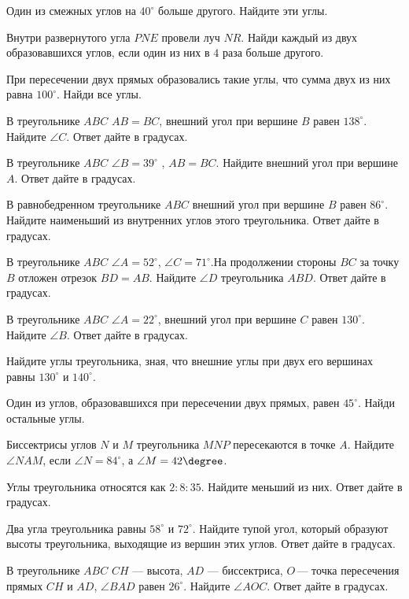 \begin{class}[number=3]
	\begin{listofex}
		\item Один из смежных углов на \( 40^{\circ} \) больше другого. Найдите эти углы.
		\item Внутри развернутого угла \( PNE \) провели луч  \( NR \). Найди каждый из двух  образовавшихся углов, если один из них в \( 4 \) раза больше другого.  
		\item При пересечении двух прямых образовались такие углы, что сумма двух из них равна \( 100^{\circ} \). Найди все углы.
		\item В треугольнике \( ABC \)    \( AB=BC \),   внешний угол при вершине \( B  \)  равен \( 138^{\circ} \).   Найдите \( \angle C \).   Ответ дайте в градусах.
		\item В треугольнике \( ABC \)   \( \angle B= 39^{\circ} \) ,  \(  AB  =BC \).   Найдите внешний угол при вершине \( A \).   Ответ дайте в градусах.
		\item В равнобедренном треугольнике \( ABC \)  внешний угол при вершине \( B \) равен \( 86^{\circ} \). Найдите наименьший из внутренних углов этого треугольника. Ответ дайте в градусах.
		\item В треугольнике \( ABC \)  \( \angle A = 52^{\circ} \), \( \angle C = 71^{\circ} \).На продолжении стороны \( BC \)   за точку \( B \)   отложен отрезок \( BD = AB \).   Найдите \( \angle D \)   треугольника \( ABD \).   Ответ дайте в градусах.
		\item В треугольнике \( ABC \)   \( \angle A = 22^{\circ} \),   внешний угол при вершине \( C \)   равен \( 130^{\circ} \).   Найдите \( \angle B \).   Ответ дайте в градусах.
		\item Найдите углы треугольника, зная, что внешние углы при двух его вершинах равны \( 130^{\circ} \) и \( 140^{\circ} \).
		\item Один из углов, образовавшихся при пересечении двух прямых, равен \( 45^{\circ} \). Найди остальные углы.
		\item Биссектрисы углов \( N \) и \( M \) треугольника \(  MNP \) пересекаются в точке \( A \). Найдите \( \angle NAM \), если \( \angle N=84^{\circ} \), а \( \angle M=42\degree \). 
		\item Углы треугольника относятся как \(  2:8:35 \). Найдите меньший из них. Ответ дайте в градусах.
		\item Два угла треугольника равны \( 58^{\circ} \) и \( 72^{\circ} \). Найдите тупой угол, который образуют высоты треугольника, выходящие из вершин этих углов. Ответ дайте в градусах.
		\item В треугольнике \( ABC \) \( CH \)  — высота, \( AD \)  — биссектриса, \( O \) — точка пересечения прямых \( CH \) и \( AD \),  \( \angle BAD \) равен \( 26^{\circ} \). Найдите \( \angle AOC \). Ответ дайте в градусах.
	\end{listofex}
\end{class}

